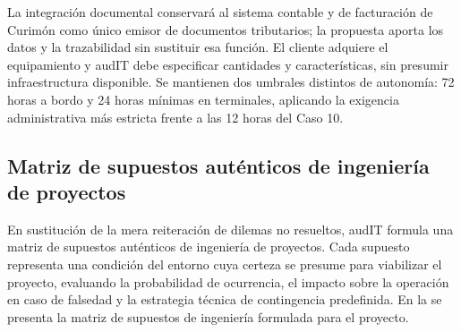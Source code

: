 La integración documental conservará al sistema contable y de facturación de Curimón como único emisor de documentos tributarios; la propuesta aporta los datos y la trazabilidad sin sustituir esa función. El cliente adquiere el equipamiento y audIT debe especificar cantidades y características, sin presumir infraestructura disponible. Se mantienen dos umbrales distintos de autonomía: 72 horas a bordo y 24 horas mínimas en terminales, aplicando la exigencia administrativa más estricta frente a las 12 horas del Caso 10.

\subsection{Matriz de supuestos auténticos de ingeniería de proyectos}\label{sec:2-supuestos-matriz}

En sustitución de la mera reiteración de dilemas no resueltos, audIT formula una matriz de supuestos auténticos de ingeniería de proyectos. Cada supuesto representa una condición del entorno cuya certeza se presume para viabilizar el proyecto, evaluando la probabilidad de ocurrencia, el impacto sobre la operación en caso de falsedad y la estrategia técnica de contingencia predefinida. En la  se presenta la matriz de supuestos de ingeniería formulada para el proyecto.

